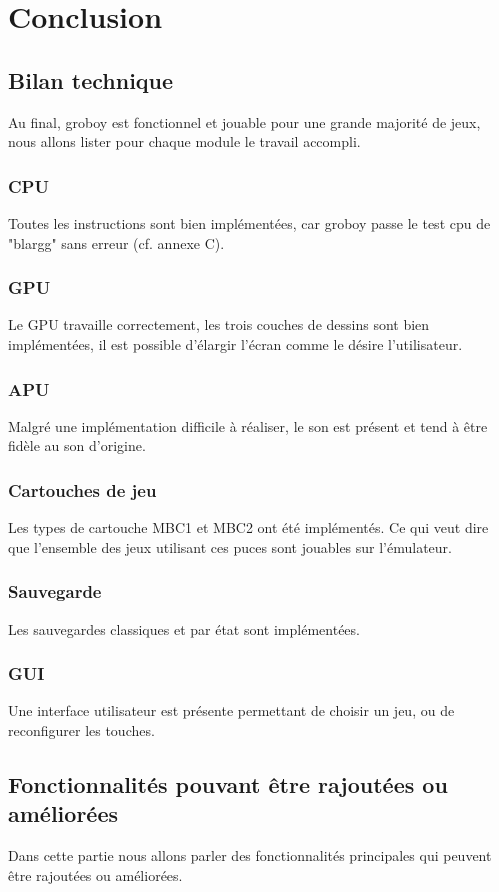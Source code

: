 \documentclass{report}
\begin{document}
\chapter*{Conclusion}
\section*{Bilan technique}
Au final, groboy est fonctionnel et jouable pour une grande majorité de jeux, nous allons lister pour chaque module le travail accompli. 
\subsection*{CPU}
Toutes les instructions sont bien implémentées, car groboy passe le test cpu de "blargg" sans erreur (cf. annexe C). 
\subsection*{GPU}
Le GPU travaille correctement, les trois couches de dessins sont bien implémentées, il est possible d'élargir l'écran comme le désire l'utilisateur.
\subsection*{APU}
Malgré une implémentation difficile à réaliser, le son est présent et tend à être fidèle au son d'origine.
\subsection*{Cartouches de jeu}
Les types de cartouche MBC1 et MBC2 ont été implémentés. Ce qui veut dire que l'ensemble des jeux utilisant ces puces sont jouables sur l'émulateur.
\subsection*{Sauvegarde}
Les sauvegardes classiques et par état sont implémentées.
\subsection*{GUI}
Une interface utilisateur est présente permettant de choisir un jeu, ou de reconfigurer les touches.
\section*{Fonctionnalités pouvant être rajoutées ou améliorées}
Dans cette partie nous allons parler des fonctionnalités principales qui peuvent être rajoutées ou améliorées.
\end{document}
